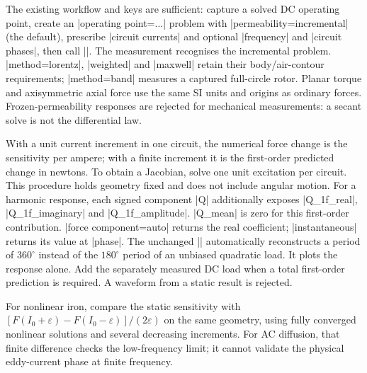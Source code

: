 The existing workflow and keys are sufficient: capture a solved DC operating
point, create an |operating point=...| problem with |permeability=incremental|
(the default), prescribe |circuit currents| and optional |frequency| and
|circuit phases|, then call |\femmmeasure[quantity=force,...]|. The measurement
recognises the incremental problem. |method=lorentz|, |weighted| and |maxwell|
retain their body/air-contour requirements; |method=band| measures a captured
full-circle rotor. Planar torque and axisymmetric axial force use the same SI
units and origins as ordinary forces. Frozen-permeability responses are rejected
for mechanical measurements: a secant solve is not the differential law.

With a unit current increment in one circuit, the numerical force change is the
sensitivity per ampere; with a finite increment it is the first-order predicted
change in newtons. To obtain a Jacobian, solve one unit excitation per circuit.
This procedure holds geometry fixed and does not include angular motion.
For a harmonic response, each signed component |Q| additionally exposes
|Q_1f_real|, |Q_1f_imaginary| and |Q_1f_amplitude|. |Q_mean| is zero for this
first-order contribution. |force component=auto| returns the real coefficient;
|instantaneous| returns its value at |phase|. The unchanged
|\femmforceplot| automatically reconstructs a period of $360^\circ$ instead of
the $180^\circ$ period of an unbiased quadratic load. It plots the response
alone. Add the separately measured DC load when a total first-order prediction
is required. A waveform from a static result is rejected.

For nonlinear iron, compare the static sensitivity with
$[F(I_0+\varepsilon)-F(I_0-\varepsilon)]/(2\varepsilon)$ on the same geometry,
using fully converged nonlinear solutions and several decreasing increments.
For AC diffusion, that finite difference checks the low-frequency limit;
it cannot validate the physical eddy-current phase at finite frequency.
